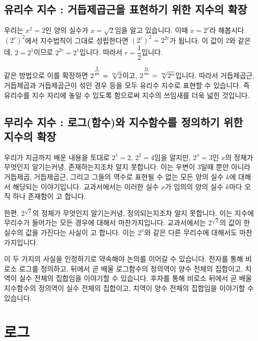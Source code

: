 \subsection{유리수 지수 : 거듭제곱근을 표현하기 위한 지수의 확장}

우리는 $x^2 = 2$인 양의 실수가 $x=\sqrt{2}$임을 알고 있습니다. 이때 $x=2^r$라 해봅시다. $\left( 2^r \right)^2$에서 지수법칙이 그대로 성립한다면  $\left( 2^r \right)^2=2^{2r}$가 됩니다. 이 값이 $2$와 같은데, $2=2^1$이므로 $2^{2r}= 2^1$입니다. 따라서 $r=\dfrac{1}{2}$입니다.

같은 방법으로 이를 확장하면 $2\expo{\tfrac{1}{m}} = \sqrt[m]{2}$이고, $2\expo{\tfrac{n}{m}} = \sqrt[m]{2^n}$입니다. 따라서 \mbox{거듭제곱근,} 거듭제곱과 거듭제곱근이 섞인 경우 등을 모두 유리수 지수로 표현할 수 있습니다. 즉 유리수를 지수 자리에 놓일 수 있도록 함으로써 지수의 쓰임새를 더욱 넓힌 것입니다. 

\subsection{무리수 지수 : 로그(함수)와 지수함수를 정의하기 위한 지수의 확장}
우리가 지금까지 배운 내용을 토대로 $2^1= 2$, $2^2=4$임을 알지만, $2^x=3$인 $x$의 정체가 무엇인지 알기는커녕, 존재하는지조차 알지 못합니다. 이는 우변이 $3$일때 뿐만 아니라 거듭제곱, 거듭제곱근, 그리고 그들의 역수로 표현될 수 없는 모든 양의 실수 $k$에 대해서 해당되는 이야기입니다. 교과서에서는 이러한 실수 $x$가 임의의 양의 실수 $k$마다 오직 하나 존재함이 고 합니다.

한편, $2^{\sqrt{2}}$의 정체가 무엇인지 알기는커녕, 정의되는지조차 알지 못합니다. 이는 지수에 무리수가 들어가는 모든 경우에 대해서 마찬가지입니다. 교과서에서는 $2^{\sqrt{2}}$의 값이 한 실수의 값을 가진다는 사실이 고 합니다. 이는 $2^{\pi}$와 같은 다른 무리수에 대해서도 마찬가지입니다.

이  두 가지의 사실을 인정하기로 약속해야 논의를 이어갈 수 있습니다. 전자를 통해 비로소 로그를 정의하고, 뒤에서 곧 배울 로그함수의 정의역이 양수 전체의 집합이고, 치역이 실수 전체의 집합임을 이야기할 수 있습니다. 후자를 통해 비로소 뒤에서 곧 배울 지수함수의 정의역이 실수 전체의 집합이고, 치역이 양수 전체의 집합임을 이야기할 수 있습니다.
\clearpage
\section{로그}
